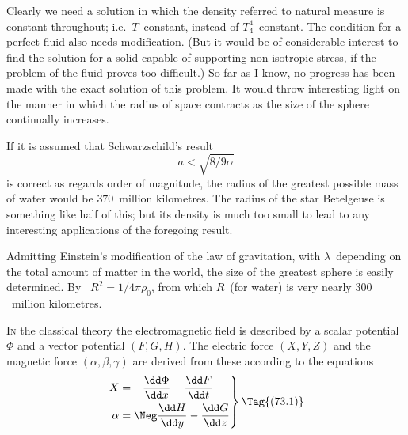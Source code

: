 \documentclass[12pt]{book}
\begin{document}
Clearly we need a solution in which the density referred to natural measure
is constant throughout; i.e.\ $T$~constant, instead of $T_{4}^{4}$~constant. The condition
for a perfect fluid also needs modification. (But it would be of considerable
interest to find the solution for a solid capable of supporting non-isotropic
stress, if the problem of the fluid proves too difficult.) So far as I know, no
progress has been made with the exact solution of this problem. It would
throw interesting light on the manner in which the radius of space contracts
as the size of the sphere continually increases.

If it is assumed that Schwarzschild's result
\[
a < \sqrt{8/9\alpha}
\]
is correct as regards order of magnitude, the radius of the greatest possible
mass of water would be $370$~million kilometres. The radius of the star Betelgeuse
is something like half of this; but its density is much too small to lead
to any interesting applications of the foregoing result.

Admitting Einstein's modification of the law of gravitation, with $\lambda$~depending
on the total amount of matter in the world, the size of the greatest
sphere is easily determined. By~ $R^{2} = 1/4\pi\rho_{0}$, from which $R$~(for water)
is very nearly $300$~million kilometres.


%
%
%

\lettrine{I}{n} the classical theory the electromagnetic field is described by a scalar
potential~$\Phi$ and a vector potential $(F, G, H)$. The electric force $(X, Y, Z)$
%
%
and the magnetic force $(\alpha, \beta, \gamma)$ are derived from these according to the
equations
\[
\left.
\begin{aligned}
  X &= -\frac{\dd\Phi}{\dd x} - \frac{\dd F}{\dd t}\\
  \alpha &= \Neg\frac{\dd H}{\dd y} - \frac{\dd G}{\dd z}
\end{aligned}
\right\}
\Tag{(73.1)}
\]
\end{document}
